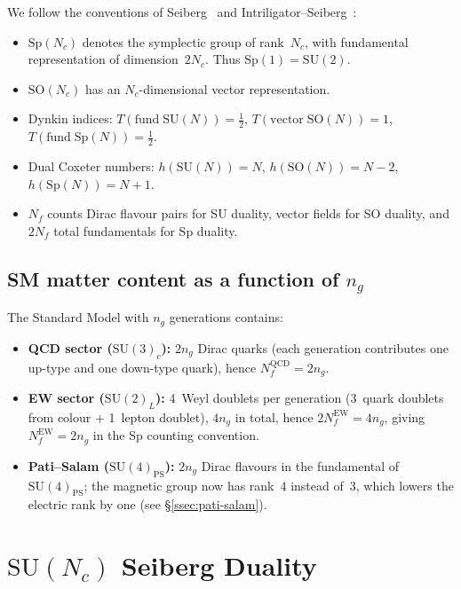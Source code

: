 \documentclass[11pt,a4paper]{article}
\theoremstyle{plain}
\theoremstyle{definition}
\theoremstyle{remark}
\newcommand{\Nc}{N_{\!c}}
\newcommand{\Nf}{N_{\!f}}
\newcommand{\ngen}{n_g}
\newcommand{\SU}[1]{\mathrm{SU}(#1)}
\newcommand{\SO}[1]{\mathrm{SO}(#1)}
\newcommand{\Sp}[1]{\mathrm{Sp}(#1)}
\begin{document}
We follow the conventions of Seiberg~\cite{Seiberg1995} and
Intriligator--Seiberg~\cite{IS9506101,IS1995}:
\begin{itemize}
  \item $\Sp{\Nc}$ denotes the symplectic group of rank~$\Nc$, with
    fundamental representation of dimension~$2\Nc$.  Thus
    $\Sp{1} = \SU{2}$.
  \item $\SO{\Nc}$ has an $\Nc$-dimensional vector representation.
  \item Dynkin indices: $T(\mathrm{fund}\;\SU{N}) = \tfrac{1}{2}$,
    $T(\mathrm{vector}\;\SO{N}) = 1$,
    $T(\mathrm{fund}\;\Sp{N}) = \tfrac{1}{2}$.
  \item Dual Coxeter numbers: $h(\SU{N}) = N$, $h(\SO{N}) = N - 2$,
    $h(\Sp{N}) = N + 1$.
  \item $\Nf$ counts Dirac flavour pairs for SU duality, vector fields
    for SO duality, and $2\Nf$ total fundamentals for Sp duality.
\end{itemize}

\subsection{SM matter content as a function of $\ngen$}
\label{ssec:SM-matter}

The Standard Model with $\ngen$ generations contains:
\begin{itemize}
  \item \textbf{QCD sector ($\SU{3}_c$):} $2\ngen$ Dirac quarks
    (each generation contributes one up-type and one down-type quark),
    hence $\Nf^{\mathrm{QCD}} = 2\ngen$.
  \item \textbf{EW sector ($\SU{2}_L$):} 4~Weyl doublets per
    generation (3~quark doublets from colour $+$ 1~lepton doublet),
    $4\ngen$ in total, hence $2\Nf^{\mathrm{EW}} = 4\ngen$, giving
    $\Nf^{\mathrm{EW}} = 2\ngen$ in the Sp counting convention.
  \item \textbf{Pati--Salam ($\SU{4}_{\mathrm{PS}}$):}
    $2\ngen$ Dirac flavours in the fundamental of $\SU{4}_{\mathrm{PS}}$;
    the magnetic group now has rank~4 instead of~3, which lowers the
    electric rank by one (see \S\ref{ssec:pati-salam}).
\end{itemize}


\section{$\SU{\Nc}$ Seiberg Duality}
\label{sec:SU-duality}
\end{document}
